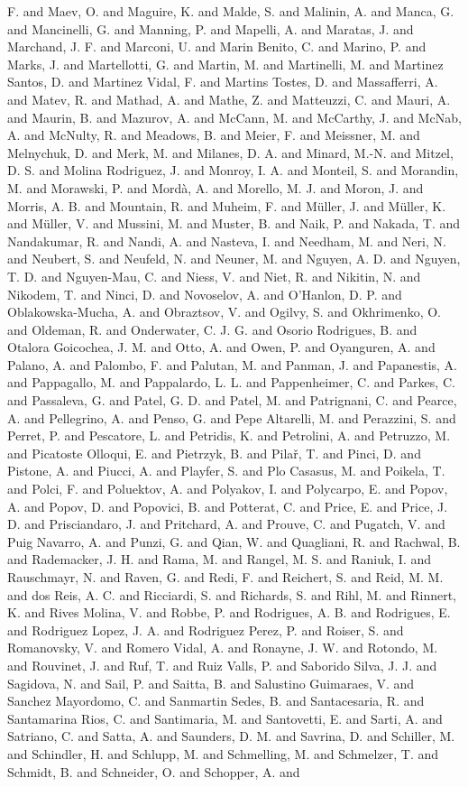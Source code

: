 {F. and Maev, O. and Maguire, K. and Malde, S. and Malinin, A. and Manca, G. and Mancinelli, G. and Manning, P. and Mapelli, A. and Maratas, J. and Marchand, J. F. and Marconi, U. and Marin Benito, C. and Marino, P. and Marks, J. and Martellotti, G. and Martin, M. and Martinelli, M. and Martinez Santos, D. and Martinez Vidal, F. and Martins Tostes, D. and Massafferri, A. and Matev, R. and Mathad, A. and Mathe, Z. and Matteuzzi, C. and Mauri, A. and Maurin, B. and Mazurov, A. and McCann, M. and McCarthy, J. and McNab, A. and McNulty, R. and Meadows, B. and Meier, F. and Meissner, M. and Melnychuk, D. and Merk, M. and Milanes, D. A. and Minard, M.-N. and Mitzel, D. S. and Molina Rodriguez, J. and Monroy, I. A. and Monteil, S. and Morandin, M. and Morawski, P. and Mord\`a, A. and Morello, M. J. and Moron, J. and Morris, A. B. and Mountain, R. and Muheim, F. and M\"uller, J. and M\"uller, K. and M\"uller, V. and Mussini, M. and Muster, B. and Naik, P. and Nakada, T. and Nandakumar, R. and Nandi, A. and Nasteva, I. and Needham, M. and Neri, N. and Neubert, S. and Neufeld, N. and Neuner, M. and Nguyen, A. D. and Nguyen, T. D. and Nguyen-Mau, C. and Niess, V. and Niet, R. and Nikitin, N. and Nikodem, T. and Ninci, D. and Novoselov, A. and O'Hanlon, D. P. and Oblakowska-Mucha, A. and Obraztsov, V. and Ogilvy, S. and Okhrimenko, O. and Oldeman, R. and Onderwater, C. J. G. and Osorio Rodrigues, B. and Otalora Goicochea, J. M. and Otto, A. and Owen, P. and Oyanguren, A. and Palano, A. and Palombo, F. and Palutan, M. and Panman, J. and Papanestis, A. and Pappagallo, M. and Pappalardo, L. L. and Pappenheimer, C. and Parkes, C. and Passaleva, G. and Patel, G. D. and Patel, M. and Patrignani, C. and Pearce, A. and Pellegrino, A. and Penso, G. and Pepe Altarelli, M. and Perazzini, S. and Perret, P. and Pescatore, L. and Petridis, K. and Petrolini, A. and Petruzzo, M. and Picatoste Olloqui, E. and Pietrzyk, B. and Pila\ifmmode {}\else \v{r}\fi{}, T. and Pinci, D. and Pistone, A. and Piucci, A. and Playfer, S. and Plo Casasus, M. and Poikela, T. and Polci, F. and Poluektov, A. and Polyakov, I. and Polycarpo, E. and Popov, A. and Popov, D. and Popovici, B. and Potterat, C. and Price, E. and Price, J. D. and Prisciandaro, J. and Pritchard, A. and Prouve, C. and Pugatch, V. and Puig Navarro, A. and Punzi, G. and Qian, W. and Quagliani, R. and Rachwal, B. and Rademacker, J. H. and Rama, M. and Rangel, M. S. and Raniuk, I. and Rauschmayr, N. and Raven, G. and Redi, F. and Reichert, S. and Reid, M. M. and dos Reis, A. C. and Ricciardi, S. and Richards, S. and Rihl, M. and Rinnert, K. and Rives Molina, V. and Robbe, P. and Rodrigues, A. B. and Rodrigues, E. and Rodriguez Lopez, J. A. and Rodriguez Perez, P. and Roiser, S. and Romanovsky, V. and Romero Vidal, A. and Ronayne, J. W. and Rotondo, M. and Rouvinet, J. and Ruf, T. and Ruiz Valls, P. and Saborido Silva, J. J. and Sagidova, N. and Sail, P. and Saitta, B. and Salustino Guimaraes, V. and Sanchez Mayordomo, C. and Sanmartin Sedes, B. and Santacesaria, R. and Santamarina Rios, C. and Santimaria, M. and Santovetti, E. and Sarti, A. and Satriano, C. and Satta, A. and Saunders, D. M. and Savrina, D. and Schiller, M. and Schindler, H. and Schlupp, M. and Schmelling, M. and Schmelzer, T. and Schmidt, B. and Schneider, O. and Schopper, A. and }
